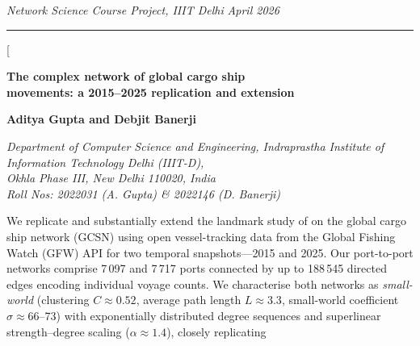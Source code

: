 \documentclass[a4paper,10pt,twocolumn]{article}
\begin{document}
\thispagestyle{empty}

\begin{strip}
  \vspace*{-6pt}
  {\fontsize{7.5}{9}\selectfont
    \textit{Network Science Course Project, IIIT Delhi} \hfill
    \textit{April 2026}}\\[-3pt]
  \rule{\linewidth}{0.5pt}
  \vspace{2pt}
\end{strip}

\twocolumn[{%
\begin{@twocolumnfalse}
  \begin{center}
    {\fontsize{17}{21}\bfseries\selectfont
      The complex network of global cargo ship\\[3pt]
      movements: a 2015--2025 replication and extension\par}
    \vspace{9pt}
    {\fontsize{10.5}{13}\bfseries\selectfont
      Aditya Gupta and Debjit Banerji\par}
    \vspace{3pt}
    {\fontsize{9}{11}\itshape\selectfont
      Department of Computer Science and Engineering,
      Indraprastha Institute of Information Technology Delhi
      (IIIT-D),\\
      Okhla Phase III, New Delhi 110020, India\\
      Roll Nos: 2022031 (A. Gupta) \& 2022146 (D. Banerji)\par}
    \vspace{10pt}
  \end{center}
  {\fontsize{9}{12}\selectfont
  We replicate and substantially extend the landmark study of
  \citet{Kaluza2010} on the global cargo ship network (GCSN)
  using open vessel-tracking data from the Global Fishing Watch
  (GFW) API for two temporal snapshots---2015 and 2025.
  Our port-to-port networks comprise 7\,097 and 7\,717 ports
  connected by up to 188\,545 directed edges encoding individual
  voyage counts.
  We characterise both networks as \emph{small-world}
  (clustering $C\approx0.52$, average path length $L\approx3.3$,
  small-world coefficient $\sigma\approx66$--73) with exponentially
  distributed degree sequences and superlinear strength--degree
  scaling ($\alpha\approx1.4$), closely replicating
}
\end{@twocolumnfalse}}
\end{document}
